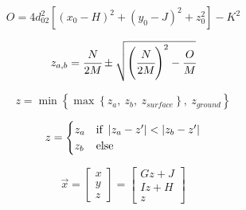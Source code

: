 \begin{equation}
	{O}=4d_{02}^2\left[\left(x_0-{H}\right)^2+\left(y_0-{J}\right)^2+z_0^2\right]-{K}^2
\end{equation}	

\begin{equation}
	z_{a,b}=\cfrac{{N}}{2{M}}\pm\sqrt{\left(\cfrac{{N}}{2{M}}\right)^2-\cfrac{{O}}{{M}}}
\end{equation}	

\begin{equation}
	z=\min\left\{\max\left\{z_a,~z_b,~z_{surface}\right\},~z_{ground}\right\}
\end{equation}	

\begin{equation}
	z=\begin{cases}
		z_a & \text{if }\left|{z_a-z'}\right|<\left|{z_b-z'}\right|\\
		z_b & \text{else}
	\end{cases}
\end{equation}	

\begin{equation}
	\vec{x}
	=\left[
	\begin{array}{c}
		x\\
		y\\
		z
	\end{array}
	\right]
	=\left[
	\begin{array}{c}
		{G}z+{J}\\
		{I}z+{H}\\
		z
	\end{array}
	\right]
\end{equation}	